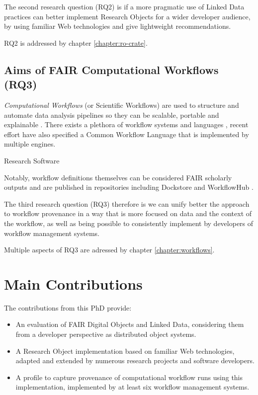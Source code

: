 The second research question (RQ2) is if a more pragmatic use of Linked Data practices can better implement Research Objects for a wider developer audience, by using familiar Web technologies and give lightweight recommendations.

RQ2 is addressed by chapter \vref{chapter:ro-crate}.


\subsection{Aims of FAIR Computational Workflows (RQ3)}

\emph{Computational Workflows} (or Scientific Workflows) are used to structure and automate data analysis pipelines so they can be scalable, portable and explainable \cite{Atkinson 2017}. There exists a plethora of workflow systems \cite{Leipzig 2021} and languages \cite{ch8-43}, recent effort have also specified a Common Workflow Language \cite{Crusoe 2022} that is implemented by multiple engines. 

Research Software \cite{ch6-3}

Notably, workflow definitions themselves can be considered FAIR scholarly outputs \cite{Goble 2020} and are published in repositories including Dockstore \cite{Yuen 2021} and WorkflowHub \cite{Goble 2021}.


The third research question (RQ3) therefore is we can unify better the approach to workflow provenance in a way that is more focused on data and the context of the workflow, as well as being possible to consistently implement by developers of workflow management systems.

Multiple aspects of RQ3 are adressed by chapter \vref{chapter:workflows}.


\section{Main Contributions}

The contributions from this PhD provide:

\begin{itemize}
    \item An evaluation of FAIR Digital Objects and Linked Data, considering them from a developer perspective as distributed object systems.
    \item A Research Object implementation based on familiar Web technologies, adapted and extended by numerous research projects and software developers.
    \item A profile to capture provenance of computational workflow runs using this implementation, implemented by at least six workflow management systems.
\end{itemize}

